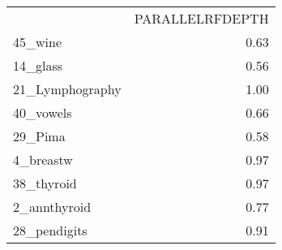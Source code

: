 \begin{tabular}{lr}
 & PARALLELRFDEPTH \\
45_wine & 0.63 \\
14_glass & 0.56 \\
21_Lymphography & 1.00 \\
40_vowels & 0.66 \\
29_Pima & 0.58 \\
4_breastw & 0.97 \\
38_thyroid & 0.97 \\
2_annthyroid & 0.77 \\
28_pendigits & 0.91 \\
\end{tabular}
